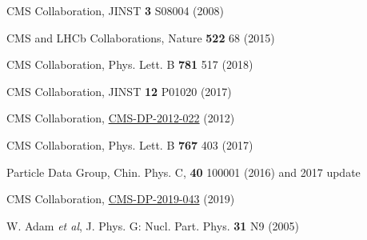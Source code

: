 \documentclass{webofc}
\begin{document}
\begin{thebibliography}{}
CMS Collaboration, JINST \textbf{3} S08004 (2008)

CMS and LHCb Collaborations, Nature \textbf{522} 68 (2015)

CMS Collaboration, Phys. Lett. B \textbf{781} 517 (2018) 

CMS Collaboration, JINST \textbf{12} P01020 (2017)

CMS Collaboration, \href{https://cds.cern.ch/record/1480607}{CMS-DP-2012-022} (2012)

CMS Collaboration, Phys. Lett. B \textbf{767} 403 (2017)

Particle Data Group, Chin. Phys. C, \textbf{40} 100001
(2016) and 2017 update

CMS Collaboration, \href{https://cds.cern.ch/record/2704495}{CMS-DP-2019-043} (2019)

W. Adam \textit{et al}, J. Phys. G: Nucl. Part. Phys. \textbf{31} N9 (2005)

\end{thebibliography}
\end{document}
